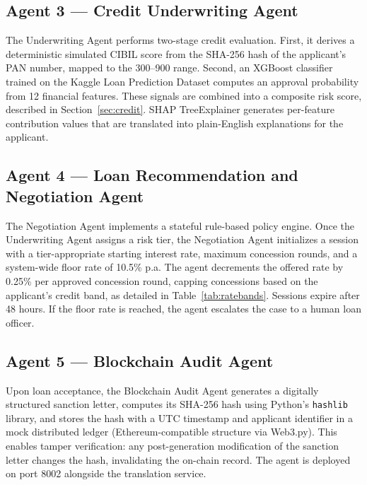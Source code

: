 \documentclass[conference]{IEEEtran}
\begin{document}
\subsection{Agent 3 — Credit Underwriting Agent}

The Underwriting Agent performs two-stage credit
evaluation. First, it derives a deterministic simulated
CIBIL score from the SHA-256 hash of the applicant's
PAN number, mapped to the 300--900 range. Second, an
XGBoost classifier trained on the Kaggle Loan
Prediction Dataset computes an approval probability
from 12 financial features. These signals are combined
into a composite risk score, described in
Section~\ref{sec:credit}. SHAP TreeExplainer generates
per-feature contribution values that are translated
into plain-English explanations for the applicant.

\subsection{Agent 4 — Loan Recommendation and
Negotiation Agent}

The Negotiation Agent implements a stateful rule-based
policy engine. Once the Underwriting Agent assigns a
risk tier, the Negotiation Agent initializes a session
with a tier-appropriate starting interest rate,
maximum concession rounds, and a system-wide floor
rate of 10.5\% p.a. The agent decrements the offered
rate by 0.25\% per approved concession round, capping
concessions based on the applicant's credit band, as
detailed in Table~\ref{tab:ratebands}. Sessions expire
after 48 hours. If the floor rate is reached, the agent
escalates the case to a human loan officer.

\subsection{Agent 5 — Blockchain Audit Agent}

Upon loan acceptance, the Blockchain Audit Agent
generates a digitally structured sanction letter,
computes its SHA-256 hash using Python's \texttt{hashlib}
library, and stores the hash with a UTC timestamp and
applicant identifier in a mock distributed ledger
(Ethereum-compatible structure via Web3.py). This
enables tamper verification: any post-generation
modification of the sanction letter changes the hash,
invalidating the on-chain record. The agent is deployed
on port 8002 alongside the translation service.

\end{document}
